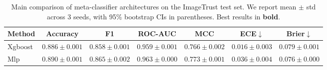 \begin{table}[t]
\centering
\caption{Main comparison of meta-classifier architectures on the ImageTrust test set. We report mean $\pm$ std across 3 seeds, with 95\% bootstrap CIs in parentheses. Best results in \textbf{bold}.}
\label{tab:main_comparison}
\begin{tabular}{l cccc cc}
\toprule
Method & Accuracy & F1 & ROC-AUC & MCC & ECE$\downarrow$ & Brier$\downarrow$ \\
\midrule
Xgboost & $0.886 \pm 0.001$ & $0.858 \pm 0.001$ & $0.959 \pm 0.001$ & $0.766 \pm 0.002$ & $0.016 \pm 0.003$ & $0.079 \pm 0.001$ \\
Mlp & $0.890 \pm 0.001$ & $0.865 \pm 0.002$ & $0.963 \pm 0.000$ & $0.773 \pm 0.001$ & $0.036 \pm 0.004$ & $0.076 \pm 0.000$ \\
\bottomrule
\end{tabular}
\end{table}